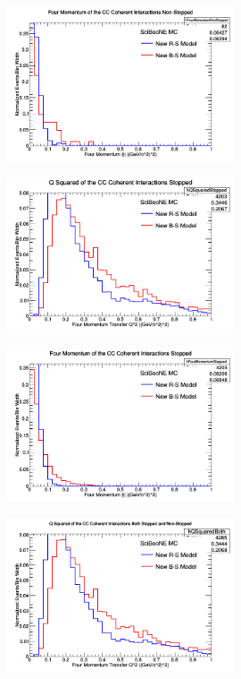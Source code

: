 \documentclass[11pt]{article}
\begin{document}
\begin{figure}[H]
\centering
\includegraphics[width=0.6\textwidth]{ANMFourSquaredPlottingImages/2-ANMFourSquaredPlotting.png}
\caption{}
\end{figure}

\begin{figure}[H]
\centering
\includegraphics[width=0.6\textwidth]{ANMFourSquaredPlottingImages/3-ANMFourSquaredPlotting.png}
\caption{}
\end{figure}

\begin{figure}[H]
\centering
\includegraphics[width=0.6\textwidth]{ANMFourSquaredPlottingImages/4-ANMFourSquaredPlotting.png}
\caption{}
\end{figure}

\begin{figure}[H]
\centering
\includegraphics[width=0.6\textwidth]{ANMFourSquaredPlottingImages/5-ANMFourSquaredPlotting.png}
\caption{}
\end{figure}
\end{document}
